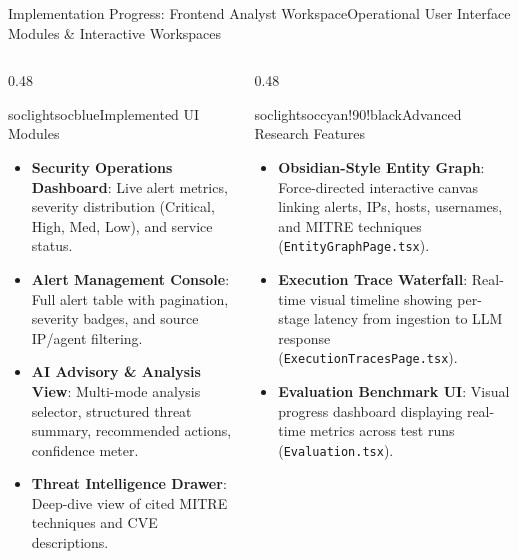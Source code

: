 \documentclass[aspectratio=169, 10pt]{beamer}
\begin{document}
\begin{frame}{Implementation Progress: Frontend Analyst Workspace}{Operational User Interface Modules \& Interactive Workspaces}
  \begin{columns}[T]
    \begin{column}{0.48\textwidth}
      \begin{cardbox}{soclight}{socblue}{Implemented UI Modules}
        \begin{itemize}\setlength{\itemsep}{2pt}
          \item \textbf{Security Operations Dashboard}: Live alert metrics, severity distribution (Critical, High, Med, Low), and service status.
          \item \textbf{Alert Management Console}: Full alert table with pagination, severity badges, and source IP/agent filtering.
          \item \textbf{AI Advisory \& Analysis View}: Multi-mode analysis selector, structured threat summary, recommended actions, confidence meter.
          \item \textbf{Threat Intelligence Drawer}: Deep-dive view of cited MITRE techniques and CVE descriptions.
        \end{itemize}
      \end{cardbox}
    \end{column}

    \begin{column}{0.48\textwidth}
      \begin{cardbox}{soclight}{soccyan!90!black}{Advanced Research Features}
        \begin{itemize}\setlength{\itemsep}{2pt}
          \item \textbf{Obsidian-Style Entity Graph}: Force-directed interactive canvas linking alerts, IPs, hosts, usernames, and MITRE techniques (\texttt{EntityGraphPage.tsx}).
          \item \textbf{Execution Trace Waterfall}: Real-time visual timeline showing per-stage latency from ingestion to LLM response (\texttt{ExecutionTracesPage.tsx}).
          \item \textbf{Evaluation Benchmark UI}: Visual progress dashboard displaying real-time metrics across test runs (\texttt{Evaluation.tsx}).
        \end{itemize}
      \end{cardbox}
    \end{column}
  \end{columns}


\end{frame}
\end{document}
